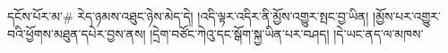 དངོས་པོར་མ་# རེད་ཉམས་འཐུང་ཉེས་མེད་དེ། །འདི་ལྟར་འདིར་ནི་མྱོས་འགྱུར་སྤང་བྱ་ཡིན། །མྱོས་པར་འགྱུར་བའི་ཕྱོགས་མཐུན་དཔེར་བྱས་ནས། །དྲེག་བཙོང་ཀེའུ་དང་སྒོག་སྐྱ་ཡིན་པར་བཤད། །དེ་ཡང་ནད་ལ་མཁས་%
